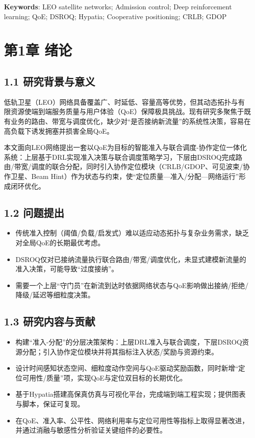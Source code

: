 \textbf{Keywords}: LEO satellite networks; Admission control; Deep
reinforcement learning; QoE; DSROQ; Hypatia; Cooperative positioning;
CRLB; GDOP

\section{第1章 绪论}\label{ux7b2c1ux7ae0-ux7eeaux8bba}

\subsection{1.1
研究背景与意义}\label{ux7814ux7a76ux80ccux666fux4e0eux610fux4e49}

低轨卫星（LEO）网络具备覆盖广、时延低、容量高等优势，但其动态拓扑与有限资源使端到端服务质量与用户体验（QoE）保障极具挑战。现有研究多聚焦于既有业务的路由、带宽与调度优化，缺少对``是否接纳新流量''的系统性决策，容易在高负载下诱发拥塞并损害全局QoE。

本文面向LEO网络提出一套以QoE为目标的智能准入与联合调度-协作定位一体化系统：上层基于DRL实现准入决策与联合调度策略学习，下层由DSROQ完成路由/带宽/调度的联合分配，同时引入协作定位模块（CRLB/GDOP、可见波束/协作卫星、Beam
Hint）作为状态与约束，使``定位质量---准入/分配---网络运行''形成闭环优化。

\subsection{1.2 问题提出}\label{ux95eeux9898ux63d0ux51fa}

\begin{itemize}
\tightlist
\item
  传统准入控制（阈值/负载/启发式）难以适应动态拓扑与复杂业务需求，缺乏对全局QoE的长期最优考虑。
\item
  DSROQ仅对已接纳流量执行联合路由/带宽/调度优化，未显式建模新流量的准入决策，可能导致``过度接纳''。
\item
  需要一个上层``守门员''在新流到达时依据网络状态与QoE影响做出接纳/拒绝/降级/延迟等细粒度决策。
\end{itemize}

\subsection{1.3
研究内容与贡献}\label{ux7814ux7a76ux5185ux5bb9ux4e0eux8d21ux732e}

\begin{itemize}
\tightlist
\item
  构建``准入-分配''的分层决策架构：上层DRL准入与联合调度，下层DSROQ资源分配；引入协作定位模块并将其指标注入状态/奖励与资源约束。
\item
  设计时间感知状态空间、细粒度动作空间与QoE驱动奖励函数，同时新增``定位可用性/质量''项，实现QoE与定位双目标的长期优化。
\item
  基于Hypatia搭建高保真仿真与可视化平台，完成端到端工程实现；提供图表与脚本，保证可复现。
\item
  在QoE、准入率、公平性、网络利用率与定位可用性等指标上取得显著改进，并通过消融与敏感性分析验证关键组件的必要性。
\end{itemize}

